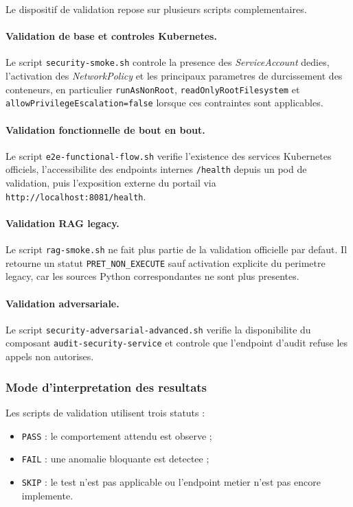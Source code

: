 Le dispositif de validation repose sur plusieurs scripts complementaires.

\paragraph{Validation de base et controles Kubernetes.}
Le script \texttt{security-smoke.sh} controle la presence des \textit{ServiceAccount} dedies, l'activation des \textit{NetworkPolicy} et les principaux parametres de durcissement des conteneurs, en particulier \texttt{runAsNonRoot}, \texttt{readOnlyRootFilesystem} et \texttt{allowPrivilegeEscalation=false} lorsque ces contraintes sont applicables.

\paragraph{Validation fonctionnelle de bout en bout.}
Le script \texttt{e2e-functional-flow.sh} verifie l'existence des services Kubernetes officiels, l'accessibilite des endpoints internes \texttt{/health} depuis un pod de validation, puis l'exposition externe du portail via \texttt{http://localhost:8081/health}.

\paragraph{Validation RAG legacy.}
Le script \texttt{rag-smoke.sh} ne fait plus partie de la validation officielle par defaut. Il retourne un statut \texttt{PRET\_NON\_EXECUTE} sauf activation explicite du perimetre legacy, car les sources Python correspondantes ne sont plus presentes.

\paragraph{Validation adversariale.}
Le script \texttt{security-adversarial-advanced.sh} verifie la disponibilite du composant \texttt{audit-security-service} et controle que l'endpoint d'audit refuse les appels non autorises.

\subsubsection{Mode d'interpretation des resultats}

Les scripts de validation utilisent trois statuts :

\begin{itemize}
  \item \texttt{PASS} : le comportement attendu est observe ;
  \item \texttt{FAIL} : une anomalie bloquante est detectee ;
  \item \texttt{SKIP} : le test n'est pas applicable ou l'endpoint metier n'est pas encore implemente.
\end{itemize}

